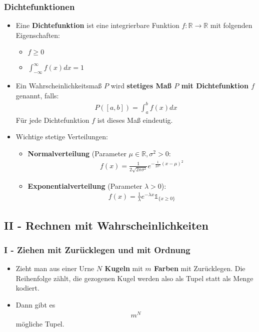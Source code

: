 \documentclass{scrartcl}
\begin{document}
\subsubsection*{Dichtefunktionen}
\begin{itemize}
    \item Eine \textbf{Dichtefunktion} ist eine integrierbare Funktion $f: \mathbb{R} \to \mathbb{R}$ mit folgenden Eigenschaften:
    \begin{itemize}
        \item $f \geq 0$
        \item $\int_{-\infty}^{\infty}f(x)dx = 1$
    \end{itemize}
    \item Ein Wahrscheinlichkeitsmaß $P$ wird \textbf{stetiges Maß $P$ mit Dichtefunktion $f$} genannt, falls:
    \begin{align*}
        P([a,b]) = \int_a^b f(x) dx
    \end{align*}
    Für jede Dichtefunktion $f$ ist dieses Maß eindeutig.
    \item Wichtige stetige Verteilungen:
    \begin{itemize}
        \item \textbf{Normalverteilung} (Parameter $\mu \in \mathbb{R}, \sigma^2 > 0$:
        \begin{align*}
            f(x) = \frac{1}{2\sqrt{2 \pi \sigma^2}}e^{-\frac{1}{2\sigma^2}(x-\mu)^2}
        \end{align*}
        \item \textbf{Exponentialverteilung} (Parameter $\lambda > 0$):
        \begin{align*}
            f(x) = \frac{1}{\lambda}e^{-\lambda x}\mathbb{1}_{\{x \geq 0\}}
        \end{align*}
    \end{itemize}
\end{itemize}
\subsection*{II - Rechnen mit Wahrscheinlichkeiten}
\subsubsection*{I - Ziehen mit Zurücklegen und mit Ordnung}
\begin{itemize}
    \item Zieht man aus einer Urne \textbf{$N$ Kugeln} mit \textbf{$m$ Farben} mit Zurücklegen. Die Reihenfolge zählt, die gezogenen Kugel werden also als Tupel statt als Menge kodiert. 
    \item Dann gibt es 
    \begin{align*}
        m^N
    \end{align*}
    mögliche Tupel.
\end{itemize}
\end{document}
